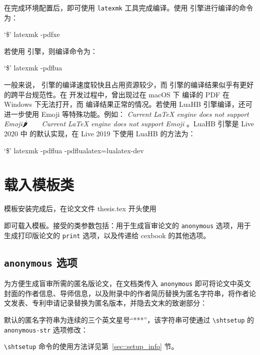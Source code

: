 \documentclass[bachelor, comfort]{shtthesis}
\newcommand\prompt{\textup{\$}}
\providecommand{\EmojiFont}{\emph{Current \LaTeX{} engine does not support Emoji}}
\providecommand{\emoji}[1]{%
  \begingroup%
  \ifluatex%
    \EmojiFont #1%
  \else%
    \EmojiFont%
  \fi%
  \endgroup%
}
\begin{document}
在完成环境配置后，即可使用 \verb|latexmk| 工具完成编译。使用  引擎进行编译的命令为：
\begin{shell}
`\prompt' latexmk -pdfxe
\end{shell}
若使用  引擎，则编译命令为：
\begin{shell}
`\prompt' latexmk -pdflua
\end{shell}
一般来说， 引擎的编译速度较快且占用资源较少，而  引擎的编译结果似乎有更好的跨平台规范性。在 \shtthesis 开发过程中，曾出现过在 macOS 下  编译的 PDF 在 Windows 下无法打开，而  编译结果正常的情况。若使用 LuaHB 引擎编译，还可进一步使用 Emoji 等特殊功能。例如：\emoji{🌶️🍐🔟💉💧🐮🍺}。LuaHB 引擎是  Live 2020 中  的默认实现，在  Live 2019 下使用 LuaHB 的方法为：
\begin{shell}
`\prompt' latexmk -pdflua -pdflualatex=lualatex-dev
\end{shell}

\section{载入模板类}
模板安装完成后，在论文文件 thesis.tex 开头使用
即可载入模板。\shtthesis 接受的类参数包括：用于生成盲审论文的 \verb|anonymous| 选项，用于生成打印版论文的 \verb|print| 选项，以及传递给 \textsf{cexbook} 的其他选项。

\subsection{\texttt{anonymous} 选项} \label{sec::option_anonymous}
为方便生成盲审所需的匿名版论文，在文档类传入 \verb|anonymous| 即可将论文中英文封面的作者信息、导师信息，以及附录中的作者简历替换为匿名字符串，将作者论文发表、专利申请记录替换为匿名版本，并隐去文末的致谢部分：
\shtthesis 默认的匿名字符串为连续的三个英文星号“***”，该字符串可使通过 \verb|\shtsetup| 的 \verb|anonymous-str| 选项修改：
\begin{latex}
\end{latex}
\verb|\shtsetup| 命令的使用方法详见第~\ref{sec::setup_info} 节。
\end{document}
